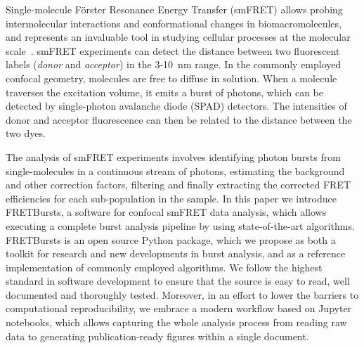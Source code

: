 Single-molecule Förster Resonance Energy Transfer (smFRET) allows probing intermolecular interactions
and conformational changes in biomacromolecules, and represents an 
invaluable tool in studying cellular processes at the molecular 
scale~\cite{Kapanidis_2006}. smFRET experiments can detect the distance between 
two fluorescent labels (\textit{donor} and \textit{acceptor}) in the 
3-10~nm range. In the commonly employed confocal geometry, molecules are free 
to diffuse in solution. When a molecule traverses the excitation volume, it 
emits a burst of photons, which can be detected by single-photon avalanche diode (SPAD) detectors. 
The intensities of donor and acceptor fluorescence 
can then be related to the distance between the two dyes.

The analysis of smFRET experiments involves identifying photon bursts from 
single-molecules in a continuous stream of photons, estimating the 
background and other correction factors, filtering and finally extracting the corrected 
FRET efficiencies for each sub-population in the sample. In this paper we introduce FRETBursts,
a software for confocal smFRET data analysis, which 
allows executing a complete burst analysis pipeline by using state-of-the-art algorithms.
FRETBursts is an open source Python package, which we propose as both a toolkit 
for research and new developments in burst analysis, and as a reference implementation of commonly employed algorithms.
We follow the highest standard in software development to ensure that 
the source is easy to read, well documented and thoroughly tested. 
Moreover, in an effort to lower the barriers to computational reproducibility, 
we embrace a modern workflow based on Jupyter notebooks, which allows capturing the whole analysis process from reading raw data to generating publication-ready figures within a single document.
